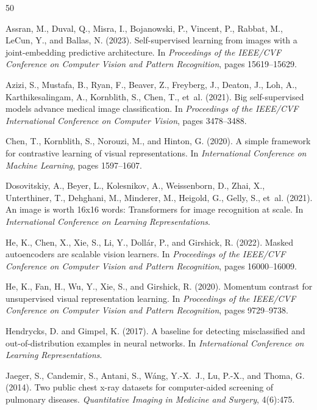 \documentclass[11pt,a4paper]{article}
\begin{document}

\begin{thebibliography}{50}

Assran, M., Duval, Q., Misra, I., Bojanowski, P., Vincent, P., Rabbat, M., LeCun, Y., and Ballas, N. (2023).
Self-supervised learning from images with a joint-embedding predictive architecture.
In \emph{Proceedings of the IEEE/CVF Conference on Computer Vision and Pattern Recognition}, pages 15619--15629.

Azizi, S., Mustafa, B., Ryan, F., Beaver, Z., Freyberg, J., Deaton, J., Loh, A., Karthikesalingam, A., Kornblith, S., Chen, T., et~al. (2021).
Big self-supervised models advance medical image classification.
In \emph{Proceedings of the IEEE/CVF International Conference on Computer Vision}, pages 3478--3488.

Chen, T., Kornblith, S., Norouzi, M., and Hinton, G. (2020).
A simple framework for contrastive learning of visual representations.
In \emph{International Conference on Machine Learning}, pages 1597--1607.

Dosovitskiy, A., Beyer, L., Kolesnikov, A., Weissenborn, D., Zhai, X., Unterthiner, T., Dehghani, M., Minderer, M., Heigold, G., Gelly, S., et~al. (2021).
An image is worth 16x16 words: Transformers for image recognition at scale.
In \emph{International Conference on Learning Representations}.

He, K., Chen, X., Xie, S., Li, Y., Doll{\'a}r, P., and Girshick, R. (2022).
Masked autoencoders are scalable vision learners.
In \emph{Proceedings of the IEEE/CVF Conference on Computer Vision and Pattern Recognition}, pages 16000--16009.

He, K., Fan, H., Wu, Y., Xie, S., and Girshick, R. (2020).
Momentum contrast for unsupervised visual representation learning.
In \emph{Proceedings of the IEEE/CVF Conference on Computer Vision and Pattern Recognition}, pages 9729--9738.

Hendrycks, D. and Gimpel, K. (2017).
A baseline for detecting misclassified and out-of-distribution examples in neural networks.
In \emph{International Conference on Learning Representations}.

Jaeger, S., Candemir, S., Antani, S., W{\'a}ng, Y.-X.~J., Lu, P.-X., and Thoma, G. (2014).
Two public chest x-ray datasets for computer-aided screening of pulmonary diseases.
\emph{Quantitative Imaging in Medicine and Surgery}, 4(6):475.


\end{thebibliography}
\end{document}
